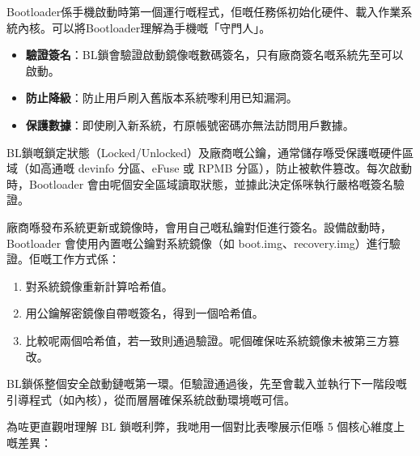 


Bootloader係手機啟動時第一個運行嘅程式，佢嘅任務係初始化硬件、載入作業系統內核。可以將Bootloader理解為手機嘅「守門人」。


\begin{itemize}
  \item \textbf{驗證簽名}：BL鎖會驗證啟動鏡像嘅數碼簽名，只有廠商簽名嘅系統先至可以啟動。
  \item \textbf{防止降級}：防止用戶刷入舊版本系統嚟利用已知漏洞。
  \item \textbf{保護數據}：即使刷入新系統，冇原帳號密碼亦無法訪問用戶數據。
\end{itemize}


BL鎖嘅鎖定狀態（Locked/Unlocked）及廠商嘅公鑰，通常儲存喺受保護嘅硬件區域（如高通嘅 devinfo 分區、eFuse 或 RPMB 分區），防止被軟件篡改。每次啟動時，Bootloader 會由呢個安全區域讀取狀態，並據此決定係咪執行嚴格嘅簽名驗證。


廠商喺發布系統更新或鏡像時，會用自己嘅私鑰對佢進行簽名。設備啟動時，Bootloader 會使用內置嘅公鑰對系統鏡像（如 boot.img、recovery.img）進行驗證。佢嘅工作方式係：

\begin{enumerate}
  \item 對系統鏡像重新計算哈希值。
  \item 用公鑰解密鏡像自帶嘅簽名，得到一個哈希值。
  \item 比較呢兩個哈希值，若一致則通過驗證。呢個確保咗系統鏡像未被第三方篡改。
\end{enumerate}


BL鎖係整個安全啟動鏈嘅第一環。佢驗證通過後，先至會載入並執行下一階段嘅引導程式（如內核），從而層層確保系統啟動環境嘅可信。


為咗更直觀咁理解 BL 鎖嘅利弊，我哋用一個對比表嚟展示佢喺 5 個核心維度上嘅差異：


